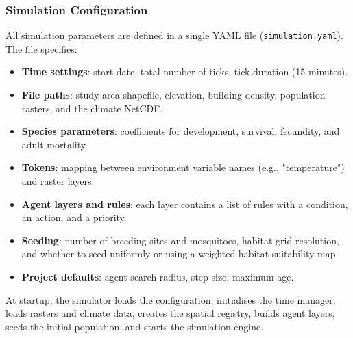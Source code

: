 \documentclass{article}
\begin{document}
\subsubsection{Simulation Configuration}
\par
All simulation parameters are defined in a single YAML file (\texttt{simulation.yaml}). The file specifies:  
\par
\begin{itemize}
  \item \textbf{Time settings}: start date, total number of ticks, tick duration (15-minutes).  
  \item \textbf{File paths}: study area shapefile, elevation, building density, population rasters, and the climate NetCDF.  
  \item \textbf{Species parameters}: coefficients for development, survival, fecundity, and adult mortality.  
  \item \textbf{Tokens}: mapping between environment variable names (e.g., "temperature") and raster layers.  
  \item \textbf{Agent layers and rules}: each layer contains a list of rules with a condition, an action, and a priority.  
  \item \textbf{Seeding}: number of breeding sites and mosquitoes, habitat grid resolution, and whether to seed uniformly or 
  using a weighted habitat suitability map.  
  \item \textbf{Project defaults}: agent search radius, step size, maximum age.
\end{itemize}
\par
At startup, the simulator loads the configuration, initialises the time manager, loads rasters and climate data, 
creates the spatial registry, builds agent layers, seeds the initial population, and starts the simulation engine.
\end{document}
